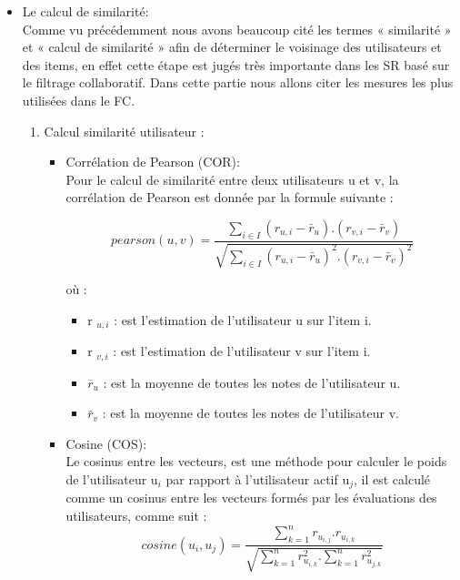 \documentclass[a4paper,12pt,letterpaper,headsepline,singlespacing,headsepline, french]{report}
\begin{document}
\begin{itemize}
	\item Le calcul de similarité:\\
Comme vu précédemment nous avons beaucoup cité les termes « similarité » et « calcul de similarité » afin de déterminer le voisinage des utilisateurs et des items, en effet cette étape est jugés très importante dans les SR basé sur le filtrage collaboratif. Dans cette partie nous allons citer les mesures les plus utilisées dans le FC.

\begin{enumerate}
	\item Calcul similarité utilisateur :\\
	\begin{itemize}
	\item Corrélation de Pearson (COR):\\Pour le calcul de similarité entre deux utilisateurs u et v, la corrélation de Pearson est donnée par la formule suivante :

\begin{equation}\label{key1}
pearson(u,v)=\frac{\sum_{i \in I} (r_{u,i}-\bar{r}_{u}).(r_{v,i}-\bar{r}_{v})}{\sqrt{\sum_{i \in I} (r_{u,i}-\bar{r}_{u})^{2}.(r_{v,i}-\bar{r}_{v})^{2}}}
\end{equation}

où :
\begin{itemize}
	\item r $_{u,i}$ : est l'estimation de l'utilisateur u sur l’item i.
	\item r $_{v,i}$ : est l'estimation de l'utilisateur v sur l’item i.
	\item $\bar{r}_{u}$ : est la moyenne de toutes les notes de l'utilisateur u. 
	\item $\bar{r}_{v}$ : est la moyenne de toutes les notes de l'utilisateur v.
\end{itemize}
\mbox{} 

\item Cosine (COS): \\Le cosinus entre les vecteurs, est une méthode pour calculer le poids de l’utilisateur u$_{i}$  par rapport à l’utilisateur actif u$_{j}$, il est calculé comme un cosinus entre les vecteurs formés par les évaluations des utilisateurs, comme suit :
\begin{equation}\label{key2}
cosine(u_{i},u_{j})=\frac{\sum_{k=1}^{n} r_{u_{i,j}}.r_{u_{i,k}}}{\sqrt{\sum_{k=1}^{n} r_{u_{i,k}}^{2}.\sum_{k=1}^{n}r_{u_{j,k}}^{2}}}
\end{equation}



\end{itemize}
\end{enumerate}
\end{itemize}
\end{document}
